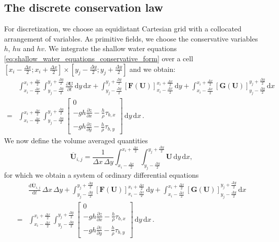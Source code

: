 \documentclass[10pt,a4paper]{article}
\newcommand{\dx}{\ensuremath{\Delta x}}
\newcommand{\dy}{\ensuremath{\Delta y}}
\begin{document}
	\subsection{The discrete conservation law}
	For discretization, we choose an equidistant Cartesian grid with a collocated arrangement of variables. As primitive fields, we choose the conservative variables $h$, $hu$ and $hv$. We integrate the shallow water equations \eqref{eq:shallow_water_equations_conservative_form} over a cell $\left[x_i-\frac{\dx}{2}; x_i+\frac{\dx}{2}\right]\times\left[y_j-\frac{\dy}{2}; y_j+\frac{\dy}{2}\right]$ and we obtain:
	\begin{equation}
	\begin{split}
	& \int_{x_i-\frac{\dx}{2}}^{x_i+\frac{\dx}{2}}\int_{y_j-\frac{\dy}{2}}^{y_j+\frac{\dy}{2}} \frac{\partial \boldsymbol{U}}{\partial t} \,\mathrm{d}y\,\mathrm{d}x +	\int_{y_j-\frac{\dy}{2}}^{y_j+\frac{\dy}{2}} \left[\boldsymbol{F}\left(\boldsymbol{U}\right)\right]_{x_i-\frac{\dx}{2}}^{x_i+\frac{\dx}{2}}\,\mathrm{d}y +\int_{x_i-\frac{\dx}{2}}^{x_i+\frac{\dx}{2}}\left[\boldsymbol{G}\left(\boldsymbol{U}\right)\right]_{y_j-\frac{\dy}{2}}^{y_j+\frac{\dy}{2}} \,\mathrm{d}x \\
	=& \int_{x_i-\frac{\dx}{2}}^{x_i+\frac{\dx}{2}}\int_{y_j-\frac{\dy}{2}}^{y_j+\frac{\dy}{2}} \begin{bmatrix}
	0 \\ -g h \frac{\partial z}{\partial x} - \frac{h}{\rho}\tau_{b,x} \\ -g h \frac{\partial z}{\partial y} - \frac{h}{\rho}\tau_{b,y}
	\end{bmatrix} \,\mathrm{d}y\,\mathrm{d}x\,.
	\end{split}
	\end{equation}
	We now define the volume averaged quantities
	\begin{equation}
	\overline{\boldsymbol{U}}_{i,j} = \frac{1}{\dx\,\dy}\int_{x_i-\frac{\dx}{2}}^{x_i+\frac{\dx}{2}}\int_{y_j-\frac{\dy}{2}}^{y_j+\frac{\dy}{2}} \boldsymbol{U}\,\mathrm{d}y\,\mathrm{d}x,
	\end{equation}
	for which we obtain a system of ordinary differential equations
	\begin{equation}
	\begin{split}
	& \frac{\mathrm{d}\overline{\boldsymbol{U}}_{i,j}}{\mathrm{d}t}\,\dx\,\dy +	\int_{y_j-\frac{\dy}{2}}^{y_j+\frac{\dy}{2}} \left[\boldsymbol{F}\left(\boldsymbol{U}\right)\right]_{x_i-\frac{\dx}{2}}^{x_i+\frac{\dx}{2}}\,\mathrm{d}y +\int_{x_i-\frac{\dx}{2}}^{x_i+\frac{\dx}{2}}\left[\boldsymbol{G}\left(\boldsymbol{U}\right)\right]_{y_j-\frac{\dy}{2}}^{y_j+\frac{\dy}{2}} \,\mathrm{d}x \\
	=& \int_{x_i-\frac{\dx}{2}}^{x_i+\frac{\dx}{2}}\int_{y_j-\frac{\dy}{2}}^{y_j+\frac{\dy}{2}} \begin{bmatrix}
	0 \\ -g h \frac{\partial z}{\partial x} - \frac{h}{\rho}\tau_{b,x} \\ -g h \frac{\partial z}{\partial y} - \frac{h}{\rho}\tau_{b,y}
	\end{bmatrix} \,\mathrm{d}y\,\mathrm{d}x\,.
	\end{split}
	\end{equation}
\end{document}
